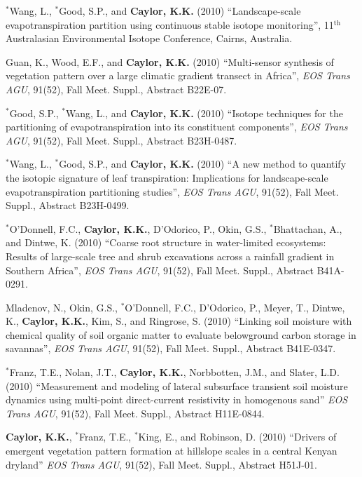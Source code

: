 \documentclass[10pt]{report}
\begin{document}
\begin{etaremune}
\item $^{*}$Wang, L., $^{*}$Good, S.P., and \textbf{Caylor, K.K.} (2010) ``Landscape-scale evapotranspiration partition using continuous stable isotope monitoring'', 11$^{\mbox{th}}$ Australasian Environmental Isotope Conference, Cairns, Australia.

\item Guan, K., Wood, E.F., and \textbf{Caylor, K.K.} (2010) ``Multi-sensor synthesis of vegetation pattern over a large climatic gradient transect in Africa'', \emph{EOS Trans AGU}, 91(52), Fall Meet. Suppl., Abstract B22E-07.

\item $^{*}$Good, S.P., $^{*}$Wang, L., and \textbf{Caylor, K.K.} (2010) ``Isotope techniques for the partitioning of evapotranspiration into its constituent components'', \emph{EOS Trans AGU}, 91(52), Fall Meet. Suppl., Abstract B23H-0487.

\item $^{*}$Wang, L., $^{*}$Good, S.P., and \textbf{Caylor, K.K.} (2010) ``A new method to quantify the isotopic signature of leaf transpiration: Implications for landscape-scale evapotranspiration partitioning studies'', \emph{EOS Trans AGU}, 91(52), Fall Meet. Suppl., Abstract B23H-0499.

\item $^{*}$O'Donnell, F.C., \textbf{Caylor, K.K.}, D'Odorico, P., Okin, G.S., $^{*}$Bhattachan, A., and Dintwe, K. (2010) ``Coarse root structure in water-limited ecosystems: Results of large-scale tree and shrub excavations across a rainfall gradient in Southern Africa'', \emph{EOS Trans AGU}, 91(52), Fall Meet. Suppl., Abstract B41A-0291.

\item Mladenov, N., Okin, G.S., $^{*}$O'Donnell, F.C., D'Odorico, P., Meyer, T., Dintwe, K., \textbf{Caylor, K.K.}, Kim, S., and Ringrose, S. (2010) ``Linking soil moisture with chemical quality of soil organic matter to evaluate belowground carbon storage in savannas'', \emph{EOS Trans AGU}, 91(52), Fall Meet. Suppl., Abstract B41E-0347.

\item $^{*}$Franz, T.E., Nolan, J.T., \textbf{Caylor, K.K.}, Norbbotten, J.M., and Slater, L.D. (2010) ``Measurement and modeling of lateral subsurface transient soil moisture dynamics using multi-point direct-current resistivity in homogenous sand'' \emph{EOS Trans AGU}, 91(52), Fall Meet. Suppl., Abstract H11E-0844.

\item \textbf{Caylor, K.K.}, $^{*}$Franz, T.E., $^{*}$King, E., and Robinson, D. (2010) ``Drivers of emergent vegetation pattern formation at hillslope scales in a central Kenyan dryland'' \emph{EOS Trans AGU}, 91(52), Fall Meet. Suppl., Abstract H51J-01.


\end{etaremune}
\end{document}
